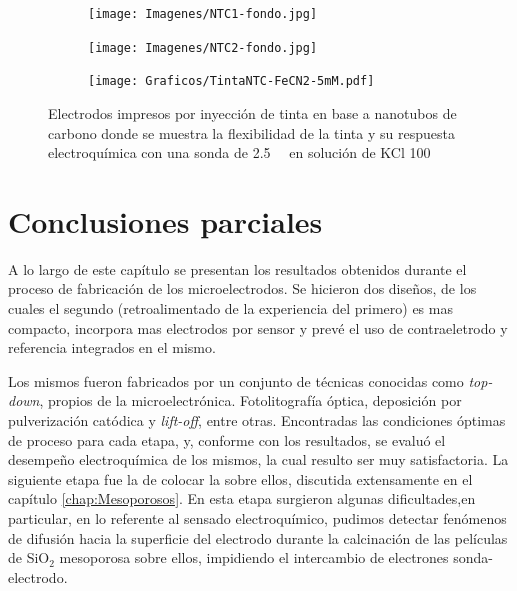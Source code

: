 	  			\begin{figure}[th]
		 	   	    \begin{subfigure}[t]{0.25\textwidth}
			       	\texttt{[image: Imagenes/NTC1-fondo.jpg]}
			   		\end{subfigure}
			   		\begin{subfigure}[t]{0.25\textwidth}
			       	\texttt{[image: Imagenes/NTC2-fondo.jpg]}
			   		\end{subfigure}
			   		\begin{subfigure}[t]{0.43\textwidth}
			   	    \texttt{[image: Graficos/TintaNTC-FeCN2-5mM.pdf]}
			   		\end{subfigure}
					 \caption[Electrodos de NTC flexibles.]{Electrodos impresos por inyección de tinta en base a nanotubos de carbono donde se muestra la flexibilidad de la tinta y su respuesta electroquímica con una sonda de \fe\space \SI{2.5}{\milli\Molar} en solución de KCl \SI{100}{\milli\Molar}}
					 \label{fig:tintas}	
				     \end{figure}
 		

\section{Conclusiones parciales}

	A lo largo de este capítulo se presentan los resultados obtenidos durante el proceso de fabricación de los microelectrodos. Se hicieron dos diseños, de los cuales el segundo (retroalimentado de la experiencia del primero) es mas compacto, incorpora mas electrodos por sensor y prevé el uso de contraeletrodo y referencia integrados en el mismo.
	
	Los mismos fueron fabricados por un conjunto de técnicas conocidas como \textit{top-down}, propios de la microelectrónica. Fotolitografía óptica, deposición por pulverización catódica y \textit{lift-off}, entre otras. Encontradas las condiciones óptimas de proceso para cada etapa, y, conforme con los resultados, se evaluó el desempeño electroquímica de los mismos, la cual resulto ser muy satisfactoria. La siguiente etapa fue la de colocar la \pdm\space sobre ellos, discutida extensamente en el capítulo \ref{chap:Mesoporosos}. En esta etapa surgieron algunas dificultades,en particular, en lo referente al sensado electroquímico, pudimos detectar fenómenos de difusión hacia la superficie del electrodo durante la calcinación de las películas de SiO$_2$ mesoporosa sobre ellos, impidiendo el intercambio de electrones sonda-electrodo. 

